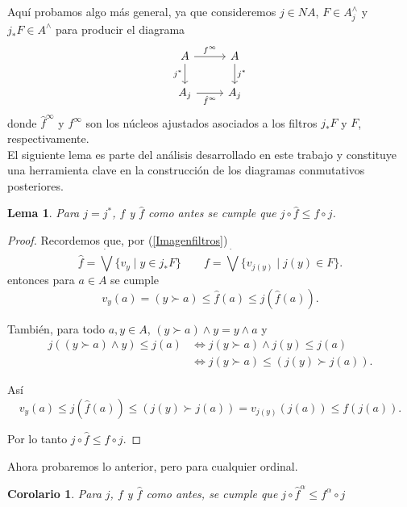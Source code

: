 \documentclass[11pt]{amsart}
\theoremstyle{plain}
\newtheorem{cor}[thm]{Corolario}
\newtheorem{lem}[thm]{Lema}
\theoremstyle{definition}
\begin{document}
Aquí probamos algo más general, ya que consideremos $j\in NA$, $F\in A_j^\wedge$ y $j_*F\in A^\wedge$ para producir el diagrama
\[\begin{tikzcd}
	A & A \\
	{A_j} & {A_j}
	\arrow["{f^\infty}", from=1-1, to=1-2]
	\arrow["j^*"', from=1-1, to=2-1]
	\arrow["j^*", from=1-2, to=2-2]
	\arrow["{\hat{f}^\infty}"', from=2-1, to=2-2]
\end{tikzcd}\]
donde $\hat{f}^\infty$ y $f^\infty$ son los núcleos ajustados asociados a los filtros $j_*F$ y $F$, respectivamente.\\

El siguiente lema es parte del análisis desarrollado en este trabajo y constituye una herramienta clave en la construcción de los diagramas conmutativos
posteriores.

\begin{lem}\label{f1f}
    Para $j=j^*$, $f$ y $\hat{f}$ como antes se cumple que $j\circ \hat{f}\leq f\circ j$.
\end{lem}
\begin{proof}
    Recordemos que, por (\ref{Imagenfiltros})
    \[
    \hat{f}=\dot{\bigvee}\{v_y\mid y\in j_*F\} \qquad f=\dot{\bigvee}\{v_{j(y)}\mid j(y)\in F\}. 
    \]
entonces para $a\in A$ se cumple
\[
v_y(a)=(y\succ a)\leq \hat{f}(a)\leq j(\hat{f}(a)).
\]

También, para todo $a, y\in A$, $(y\succ a)\wedge y=y\wedge a$ y
\[
\begin{split}
j((y\succ a)\wedge y)\leq j(a) & \Leftrightarrow j(y\succ a)\wedge j(y)\leq j(a)\\
& \Leftrightarrow j(y\succ a)\leq (j(y)\succ j(a)).
\end{split}
\]

Así 
\[
v_y(a)\leq j(\hat{f}(a))\leq (j(y)\succ j(a))=v_{j(y)}(j(a))\leq f(j(a)).
\]

Por lo tanto $j\circ \hat{f}\leq f\circ j$.
\end{proof}

Ahora probaremos lo anterior, pero para cualquier ordinal.

\begin{cor}\label{finftyf}
    Para $j$, $f$ y $\hat{f}$ como antes, se cumple que $j\circ \hat{f}^\alpha\leq f^\alpha\circ j$
\end{cor}
\end{document}
